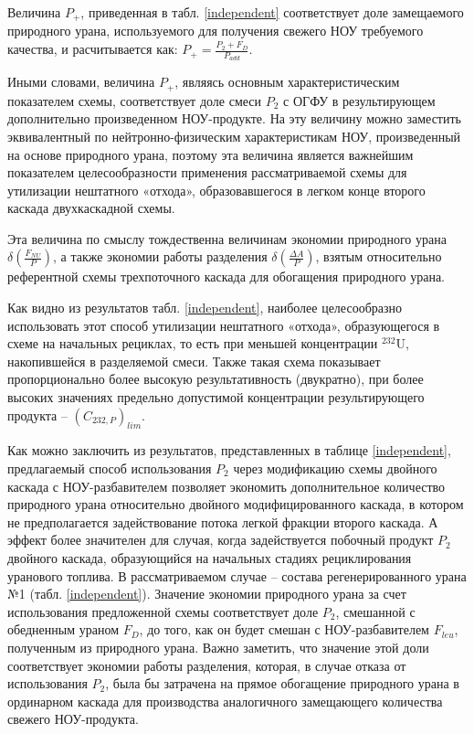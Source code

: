 {Величина $P_{+}$, приведенная в табл. \ref{independent} соответствует доле замещаемого природного урана, используемого для получения свежего НОУ требуемого качества, и расчитывается как:
$P_{+} = \frac{P_2 + F_D}{P_{add}}$.

Иными словами, величина $P_{+}$, являясь основным характеристическим показателем схемы, соответствует доле смеси $P_2$ с ОГФУ в результирующем дополнительно произведенном НОУ-продукте. На эту величину можно заместить эквивалентный по нейтронно-физическим характеристикам НОУ, произведенный на основе природного урана, поэтому эта величина является важнейшим показателем целесообразности применения рассматриваемой схемы для утилизации нештатного «отхода», образовавшегося в легком конце второго каскада двухкаскадной схемы.

Эта величина по смыслу тождественна величинам экономии природного урана $\delta(\frac{F_{NU}}{P})$, а также экономии работы разделения $\delta(\frac{\Delta A}{P})$, взятым относительно референтной схемы трехпоточного каскада для обогащения природного урана.

Как видно из результатов табл. \ref{independent}, наиболее целесообразно использовать этот способ утилизации нештатного «отхода», образующегося в схеме на начальных рециклах, то есть при меньшей концентрации $^{232}$U, накопившейся в разделяемой смеси. Также  такая схема показывает пропорционально более высокую результативность (двукратно), при более высоких значениях предельно допустимой концентрации результирующего продукта -- $(C_{232,P})_{lim}$.

Как можно заключить из результатов, представленных в таблице \ref{independent}, предлагаемый способ использования $P_2$ через модификацию схемы двойного каскада с НОУ-разбавителем позволяет экономить дополнительное количество природного урана относительно двойного модифицированного каскада, в котором не предполагается задействование потока легкой фракции второго каскада. А эффект более значителен для случая, когда задействуется побочный продукт $P_2$ двойного каскада, образующийся на начальных стадиях рециклирования уранового топлива. В рассматриваемом случае -- состава регенерированного урана №1 (табл. \ref{independent}). Значение экономии природного урана за счет использования предложенной схемы соответствует доле $P_2$, смешанной с обедненным ураном $F_D$, до того, как он будет смешан с НОУ-разбавителем $F_{leu}$, полученным из природного урана. Важно заметить, что значение этой доли соответствует экономии работы разделения, которая, в случае отказа от использования $P_2$, была бы затрачена на прямое обогащение природного урана в ординарном каскада для производства аналогичного замещающего количества свежего НОУ-продукта.

}
